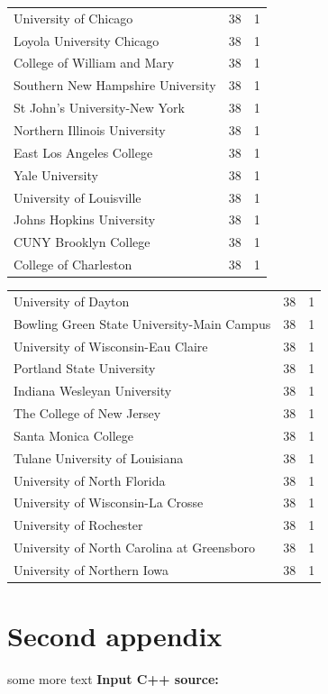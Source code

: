 \documentclass{mcmthesis}
\begin{document}
\begin{appendices}
\begin{tabular}{lcc}
        University of Chicago	&38	&1\\
        Loyola University Chicago	&38	&1\\
        College of William and Mary	&38	&1\\
        Southern New Hampshire University	&38	&1\\
        St John's University-New York	&38	&1\\
        Northern Illinois University	&38&	1\\
        East Los Angeles College	&38	&1\\
        Yale University	&38	&1\\
        University of Louisville	&38	&1\\
        Johns Hopkins University	&38	&1\\
        CUNY Brooklyn College	&38	&1\\
        College of Charleston	&38	&1\\
        
        
        \hline
    \end{tabular}
    
    \begin{tabular}{lcc}\hline
        University of Dayton	&38	&1\\
        Bowling Green State University-Main Campus	&38	&1\\
        University of Wisconsin-Eau Claire	&38	&1\\
        Portland State University	&38&	1\\
        Indiana Wesleyan University	&38	&1\\
        The College of New Jersey	&38&	1\\
        Santa Monica College	&38	&1\\
        Tulane University of Louisiana	&38&	1\\
        University of North Florida	&38&	1\\
        University of Wisconsin-La Crosse 	&38	&1\\
        University of Rochester	&38&	1\\
        University of North Carolina at Greensboro	&38&	1\\
        University of Northern Iowa	&38&	1\\\hline
        
    \end{tabular}
    
    
    \section{Second appendix}
    
    some more text \textcolor[rgb]{0.98,0.00,0.00}{\textbf{Input C++ source:}}
%    
    
\end{appendices}
\end{document}
